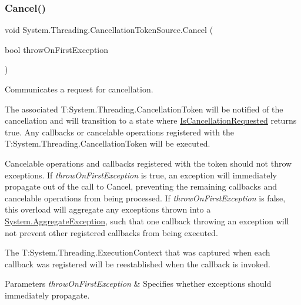 \subsubsection{\texorpdfstring{Cancel()}{Cancel()}\hspace{0.1cm}{\footnotesize\ttfamily [2/2]}}
{\footnotesize\ttfamily void System.\+Threading.\+Cancellation\+Token\+Source.\+Cancel (\begin{DoxyParamCaption}\item[{bool}]{throw\+On\+First\+Exception }\end{DoxyParamCaption})\hspace{0.3cm}{\ttfamily [inline]}}



Communicates a request for cancellation. 

The associated T\+:\+System.\+Threading.\+Cancellation\+Token will be notified of the cancellation and will transition to a state where \hyperlink{struct_system_1_1_threading_1_1_cancellation_token_a1b0338d63f9b268339e7348629301748}{Is\+Cancellation\+Requested} returns true. Any callbacks or cancelable operations registered with the T\+:\+System.\+Threading.\+Cancellation\+Token will be executed. 

Cancelable operations and callbacks registered with the token should not throw exceptions. If {\itshape throw\+On\+First\+Exception}  is true, an exception will immediately propagate out of the call to Cancel, preventing the remaining callbacks and cancelable operations from being processed. If {\itshape throw\+On\+First\+Exception}  is false, this overload will aggregate any exceptions thrown into a \hyperlink{class_system_1_1_aggregate_exception}{System.\+Aggregate\+Exception}, such that one callback throwing an exception will not prevent other registered callbacks from being executed. 

The T\+:\+System.\+Threading.\+Execution\+Context that was captured when each callback was registered will be reestablished when the callback is invoked. 


\begin{DoxyParams}{Parameters}
{\em throw\+On\+First\+Exception} & Specifies whether exceptions should immediately propagate.\\
\hline
\end{DoxyParams}

